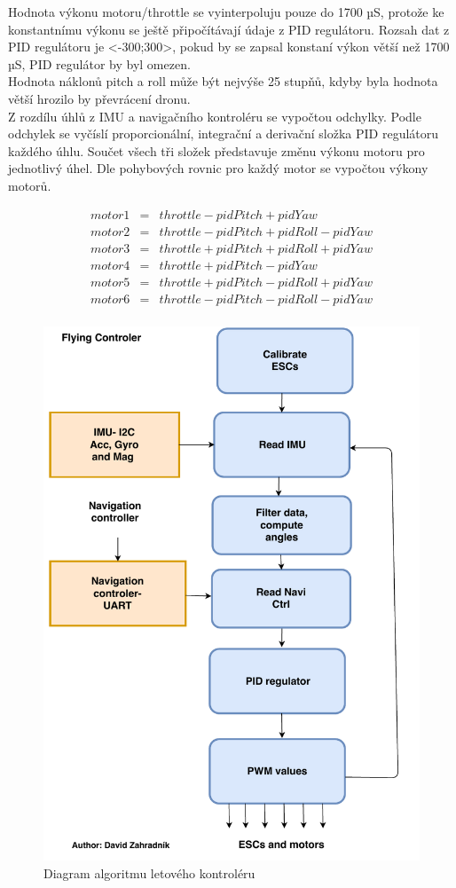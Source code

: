 Hodnota výkonu motoru/throttle se vyinterpoluju pouze do 1700 µS, protože ke konstantnímu výkonu se ještě připočítávají údaje z PID regulátoru. Rozsah dat z PID regulátoru je <-300;300>, pokud by se zapsal konstaní výkon větší než 1700 µS, PID regulátor by byl omezen.\\
Hodnota náklonů pitch a roll  může být nejvýše 25 stupňů, kdyby byla hodnota větší hrozilo by převrácení dronu.\\
Z rozdílu úhlů z IMU a navigačního kontroléru se vypočtou odchylky. Podle odchylek se vyčíslí proporcionální, integrační a derivační složka PID regulátoru každého úhlu. Součet všech tři složek představuje změnu výkonu motoru pro jednotlivý úhel. Dle pohybových rovnic pro každý motor se vypočtou výkony motorů.

\begin{eqnarray*} 
	motor1 & = & throttle - pidPitch           + pidYaw\\
	motor2 & = & throttle - pidPitch + pidRoll - pidYaw\\
	motor3 & = & throttle + pidPitch + pidRoll + pidYaw\\
	motor4 & = & throttle + pidPitch           - pidYaw\\
	motor5 & = & throttle + pidPitch - pidRoll + pidYaw\\
	motor6 & = & throttle - pidPitch - pidRoll - pidYaw\\
\end{eqnarray*} 

\begin{figure}[h]
	\centering
	\includegraphics[width=12cm]{pictures/FlyingDiagram.pdf}
	\caption{Diagram algoritmu letového kontroléru}
\end{figure}


